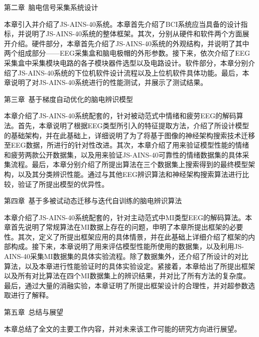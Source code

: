 第二章~脑电信号采集系统设计

本章引入并介绍了JS-AINS-40系统。本章首先介绍了BCI系统应当具备的设计指标，并说明了JS-AINS-40系统的整体框架。其次，分别从硬件和软件两个方面展开介绍。硬件部分，本章首先介绍了JS-AINS-40系统的外观结构，并说明了其中两个组成部分——EEG采集盒和脑电极帽的外形参数。接下来，依次介绍了EEG采集盒中采集模块电路的各子模块器件选型以及电路设计。软件部分，本章分别介绍了JS-AINS-40系统的下位机软件设计流程以及上位机软件具体功能。最后，本章说明了对JS-AINS-40系统进行的性能测试，并展示了测试结果。

第三章~基于梯度自动优化的脑电辨识模型

本章介绍了JS-AINS-40系统配套的，针对被动范式中情绪和疲劳EEG的解码算法。首先，本章说明了根据EEG类型所引入的特征提取方法，介绍了所设计模型的基础架构，并在此基础上，详细说明了为了将基于图像的神经架构搜索技术迁移至EEG数据，所进行的针对性改进。其次，本章介绍了用来验证模型性能的情绪和疲劳两款公开数据集，以及用来验证JS-AINS-40可靠性的情绪数据集的具体采集流程。最后，本章分别介绍了所提出算法在三个数据集上搜索得到的最终模型架构，以及其分类辨识性能。通过与其他EEG辨识算法和神经架构搜索算法进行比较，验证了所提出模型的优异性。

第四章~基于多被试动态迁移与迭代自训练的脑电辨识算法

本章介绍了JS-AINS-40系统配套的，针对主动范式中MI类型EEG的解码算法。本章首先说明了常规算法在MI数据上存在的问题，申明了本章所提出框架的必要性。其次，定义了所提出框架应用的具体情景，并在此基础上详细介绍了框架的内部构成。接下来，本章说明了用来评估模型性能所使用的数据集，以及利用JS-AINS-40采集MI数据集的具体实验流程。除了数据集外，还介绍了所设计的对比算法，以及本章进行性能验证时的具体实验设定。紧接着，本章给出了所提出框架以及所有对比算法在四个MI数据集上的辨识结果，并对比了所有方法的复杂度。最后，通过大量的消融实验，本章证明了所提出框架设计的合理性，并对超参数选取进行了解释。

第五章~总结与展望

本章总结了全文的主要工作内容，并对未来该工作可能的研究方向进行展望。
